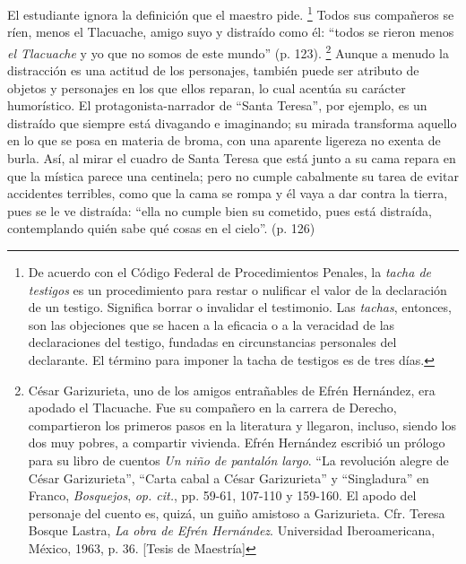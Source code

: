\documentclass[14pt,twoside,final]{extbook} %
\let\oldfootnote\footnote
\renewcommand\footnote[1]{%
\oldfootnote{\hspace{1mm}#1}}
\begin{document}
El estudiante ignora la definición que el maestro pide.\footnote{De acuerdo con el Código Federal de Procedimientos Penales, la \emph{tacha de testigos} es un procedimiento para restar o nulificar el valor de la declaración de un testigo. Significa borrar o invalidar el testimonio. Las \emph{tachas}, entonces, son las objeciones que se hacen a la eficacia o a la veracidad de las declaraciones del testigo, fundadas en circunstancias personales del declarante. El término para imponer la tacha de testigos es de tres días.} Todos sus compañeros se ríen, menos el Tlacuache, amigo suyo y distraído como él: ``todos se rieron menos \emph{el Tlacuache} y yo que no somos de este mundo'' (p. 123).\footnote{César Garizurieta, uno de los amigos entrañables de Efrén Hernández, era apodado el Tlacuache. Fue su compañero en la carrera de Derecho, compartieron los primeros pasos en la literatura y llegaron, incluso, siendo los dos muy pobres, a compartir vivienda. Efrén Hernández escribió un prólogo para su libro de cuentos \emph{Un niño de pantalón largo}. ``La revolución alegre de César Garizurieta'', ``Carta cabal a César Garizurieta'' y ``Singladura'' en Franco, \emph{Bosquejos}, \emph{op. cit.}, pp. 59-61, 107-110 y 159-160. El apodo del personaje del cuento es, quizá, un guiño amistoso a Garizurieta.  Cfr. Teresa Bosque Lastra, \emph{La obra de Efrén Hernández}. Universidad Iberoamericana, México, 1963, p. 36. [Tesis de Maestría]} Aunque a menudo la distracción es una actitud de los personajes, también puede ser atributo de objetos y personajes en los que ellos reparan, lo cual acentúa su carácter humorístico. El protagonista-narrador de ``Santa Teresa'', por ejemplo, es un distraído que siempre está divagando e imaginando; su mirada transforma aquello en lo que se posa en materia de broma, con una aparente ligereza no exenta de burla. Así, al mirar el cuadro de Santa Teresa que está junto a su cama repara en que la mística parece una centinela; pero no cumple cabalmente su tarea de evitar accidentes terribles, como que la cama se rompa y él vaya a dar contra la tierra, pues se le ve distraída: ``ella no cumple bien su cometido, pues está distraída, contemplando quién sabe qué cosas en el cielo''. (p. 126)
\end{document}
